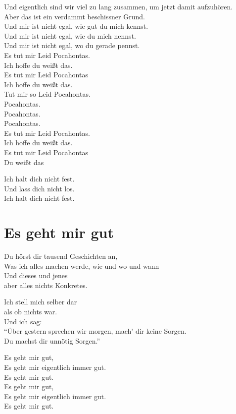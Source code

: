 \documentclass[]{book}
\begin{document}
Und eigentlich sind wir viel zu lang zusammen, um jetzt damit aufzuhören.\\
Aber das ist ein verdammt beschissner Grund.\\
Und mir ist nicht egal, wie gut du mich kennst.\\
Und mir ist nicht egal, wie du mich nennst.\\
Und mir ist nicht egal, wo du gerade pennst.\\
Es tut mir Leid Pocahontas.\\
Ich hoffe du weißt das.\\
Es tut mir Leid Pocahontas\\
Ich hoffe du weißt das.\\
Tut mir so Leid Pocahontas.\\
Pocahontas.\\
Pocahontas.\\
Pocahontas.\\
Es tut mir Leid Pocahontas.\\
Ich hoffe du weißt das.\\
Es tut mir Leid Pocahontas\\
Du weißt das

Ich halt dich nicht fest.\\
Und lass dich nicht los.\\
Ich halt dich nicht fest.

\hypertarget{es-geht-mir-gut}{%
\section{Es geht mir gut}\label{es-geht-mir-gut}}

Du hörst dir tausend Geschichten an,\\
Was ich alles machen werde, wie und wo und wann\\
Und dieses und jenes\\
aber alles nichts Konkretes.

Ich stell mich selber dar\\
als ob nichts war.\\
Und ich sag:\\
``Über gestern sprechen wir morgen, mach' dir keine Sorgen.\\
Du machst dir unnötig Sorgen.''

Es geht mir gut,\\
Es geht mir eigentlich immer gut.\\
Es geht mir gut.\\
Es geht mir gut,\\
Es geht mir eigentlich immer gut.\\
Es geht mir gut.
\end{document}
